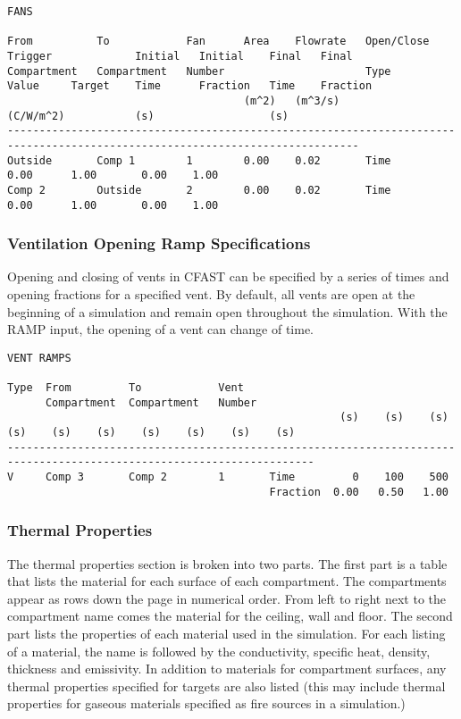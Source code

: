\begin{lstlisting}[basicstyle=\tiny]
FANS

From          To            Fan      Area    Flowrate   Open/Close  Trigger             Initial   Initial    Final   Final
Compartment   Compartment   Number                      Type        Value     Target    Time      Fraction   Time    Fraction
                                     (m^2)   (m^3/s)                (C/W/m^2)           (s)                  (s)
-----------------------------------------------------------------------------------------------------------------------------
Outside       Comp 1        1        0.00    0.02       Time                            0.00      1.00       0.00    1.00
Comp 2        Outside       2        0.00    0.02       Time                            0.00      1.00       0.00    1.00
\end{lstlisting}
\subsubsection{Ventilation Opening Ramp Specifications}
Opening and closing of vents in CFAST can be specified by a series of times and opening fractions for a specified vent. By default, all vents are open at the beginning of a simulation and remain open throughout the simulation.  With the RAMP input, the opening of a vent can change of time.

\begin{lstlisting}[basicstyle=\tiny]
VENT RAMPS

Type  From         To            Vent
      Compartment  Compartment   Number
                                                    (s)    (s)    (s)    (s)    (s)    (s)    (s)    (s)    (s)    (s)
----------------------------------------------------------------------------------------------------------------------
V     Comp 3       Comp 2        1       Time         0    100    500
                                         Fraction  0.00   0.50   1.00
\end{lstlisting}

\subsubsection{Thermal Properties}

The thermal properties section is broken into two parts.  The first part is a table that lists the material for each surface of each compartment.  The compartments appear as rows down the page in numerical order.  From left to right next to the compartment name comes the material for the ceiling, wall and floor.  The second part lists the properties of each material used in the simulation. For each listing of a material, the name is followed by the conductivity, specific heat, density, thickness and emissivity. In addition to materials for compartment surfaces, any thermal properties specified for targets are also listed (this may include thermal properties for gaseous materials specified as fire sources in a simulation.)

